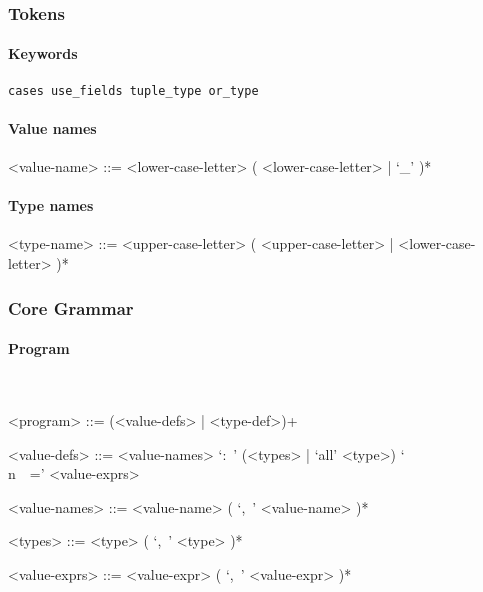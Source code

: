\documentclass{article}
\begin{document}
\subsubsection{Tokens}

\paragraph{Keywords}

\begin{verbatim}
cases use_fields tuple_type or_type
\end{verbatim}

\paragraph{Value names}

\begin{grammar}
<value-name> ::= 
<lower-case-letter> ( <lower-case-letter> | `_' )*
\end{grammar}

\paragraph{Type names}

\begin{grammar}
<type-name> ::= 
<upper-case-letter> ( <upper-case-letter> | <lower-case-letter> )*
\end{grammar}



\subsubsection{Core Grammar}

\setlength{\grammarparsep}{20pt}
\setlength{\grammarindent}{12em}

\paragraph{Program}
\hspace{1cm}\\
\begin{grammar}

<program> ::= (<value-defs> | <type-def>)+

<value-defs> ::=
<value-names> `:\ ' (<types> | `all' <type>) `\\n\ \ =' <value-exprs>

<value-names> ::= <value-name> ( `,\ ' <value-name> )*  

<types> ::= <type> ( `,\ ' <type> )*  

<value-exprs> ::= <value-expr> ( `,\ ' <value-expr> )*  

\end{grammar}
\hspace{1cm}\\
\end{document}
